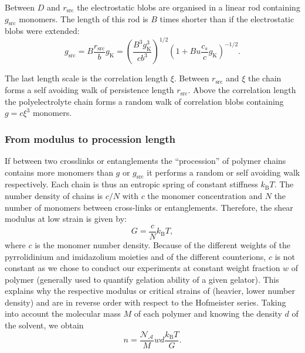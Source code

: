 \documentclass[journal=jacsat,manuscript=article]{achemso}
\begin{document}
Between $D$ and $r_\mathrm{src}$ the electrostatic blobs are organised in a linear rod containing $g_\mathrm{src}$ monomers. The length of this rod is $B$ times shorter than if the electrostatic blobs were extended:
\begin{equation}
g_\mathrm{src} = B \frac{r_\mathrm{src}}{b} g_\mathrm{K} = \left(\frac{B^3 g_\mathrm{K}^3}{cb^3}\right)^{1/2} \left(1 + B u \frac{c_s}{c} g_\mathrm{K}\right)^{-1/2}.
\label{eq:gscr}
\end{equation}

The last length scale is the correlation length $\xi$. Between $r_\mathrm{src}$ and $\xi$ the chain forms a self avoiding walk of persistence length $r_\mathrm{src}$. Above the correlation length the polyelectrolyte chain forms a random walk of correlation blobs containing $g=c\xi^3$ monomers.


\subsubsection{From modulus to procession length}

If between two crosslinks or entanglements the ``procession'' of polymer chains contains more monomers than $g$ or $g_\mathrm{src}$ it performs a random or self avoiding walk respectively. Each chain is thus an entropic spring of constant stiffness $k_\mathrm{B}T$. The number density of chains is $c/N$ with $c$ the monomer concentration and $N$ the number of monomers between cross-links or entanglements. Therefore, the shear modulus at low strain is given by:
\begin{equation}
G = \frac{c}{N}k_\mathrm{B}T,
\label{eq:G}
\end{equation}
where $c$ is the monomer number density. Because of the different weights of the pyrrolidinium and imidazolium moieties and of the different counterions, $c$ is not constant as we chose to conduct our experiments at constant weight fraction $w$ of polymer (generally used to quantify gelation ability of a given gelator). This explains why the respective modulus or critical strains of  (heavier, lower number density) and  are in reverse order with respect to the Hofmeister series. Taking into account the molecular mass $M$ of each polymer and  knowing the density $d$ of the solvent, we obtain
\begin{equation}
n = \frac{\mathcal{N_A}}{M} w d \frac{k_\mathrm{B}T}{G}.
\label{eq:n}
\end{equation}
\end{document}
